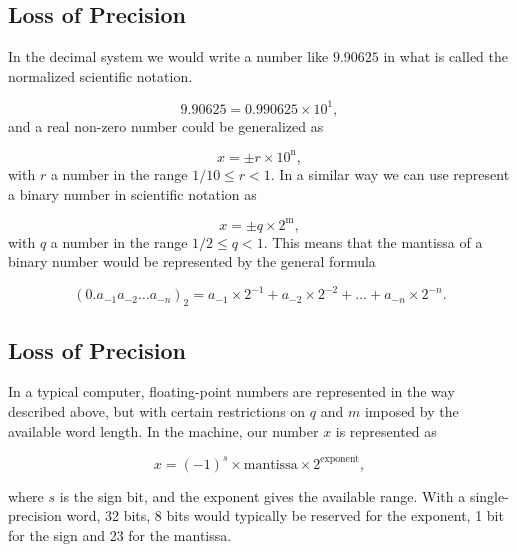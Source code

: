 \documentclass[%
twoside,                 %
final,                   %
10pt]{article}
\newenvironment{block_mdfboxadmon}[1][]{
\begin{block_mdfboxmdframed}[frametitle=#1]
}
{
\end{block_mdfboxmdframed}
}
\begin{document}
\subsection{Loss of Precision}


\begin{block_mdfboxadmon}
In the decimal system we would write a number like $9.90625$
in what is called the normalized scientific notation.

\[
  9.90625=0.990625\times 10^{1},
\]
and a real non-zero number could be generalized as

\begin{equation}
    x=\pm r\times 10^{{\mbox{n}}},
\end{equation}
with $r$ a number in the range $1/10 \le r < 1$.
In a similar way we can use represent a binary number in
scientific notation as

\begin{equation}
    x=\pm q\times 2^{{\mbox{m}}},
\end{equation}
with $q$ a number in the range $1/2 \le q < 1$.
This means that the mantissa of a binary number would be represented by
the general formula

\begin{equation}
(0.a_{-1}a_{-2}\dots a_{-n})_2=a_{-1}\times 2^{-1}
+a_{-2}\times 2^{-2}+\dots+a_{-n}\times 2^{-n}.
\end{equation}
\end{block_mdfboxadmon}



\subsection{Loss of Precision}


\begin{block_mdfboxadmon}
In a typical computer, floating-point numbers are represented
in the way described above, but with certain restrictions
on $q$ and $m$ imposed by the available word length.
In the machine, our
number $x$ is represented as

\begin{equation}
    x=(-1)^s\times {\mbox{mantissa}}\times 2^{{\mbox{exponent}}},
\end{equation}

where $s$ is the sign bit, and the exponent gives the available range.
With a single-precision word, 32 bits, 8 bits would typically be reserved
for the exponent,  1 bit for the sign and 23 for the mantissa.
\end{block_mdfboxadmon}
\end{document}
